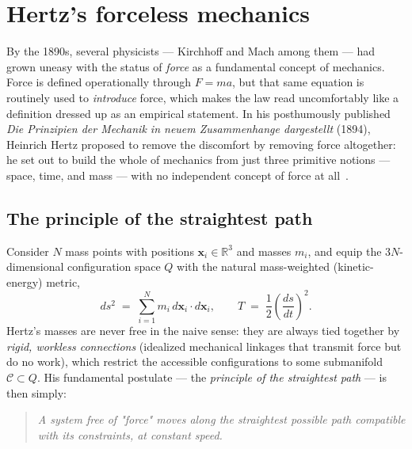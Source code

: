 \section{Hertz's forceless mechanics }
\label{lnf:hertz}

By the 1890s, several physicists --- Kirchhoff and Mach among them
--- had grown uneasy with the status of \emph{force} as a
fundamental concept of mechanics. Force is defined operationally
through $F=ma$, but that same equation is routinely used to
\emph{introduce} force, which makes the law read uncomfortably like
a definition dressed up as an empirical statement. In his
posthumously published \emph{Die Prinzipien der Mechanik in neuem
Zusammenhange dargestellt} (1894), Heinrich Hertz proposed to remove
the discomfort by removing force altogether: he set out to build the
whole of mechanics from just three primitive notions --- space,
time, and mass --- with no independent concept of force at
all~\cite{hertz}.

\subsection{The principle of the straightest path}

Consider $N$ mass points with positions $\mathbf x_i\in\mathbb R^3$
and masses $m_i$, and equip the $3N$-dimensional configuration space
$Q$ with the natural mass-weighted (kinetic-energy) metric,
\begin{equation}
  ds^2 \;=\; \sum_{i=1}^N m_i\, d\mathbf x_i\cdot d\mathbf x_i,
  \qquad
  T \;=\; \frac12\left(\frac{ds}{dt}\right)^{\!2}.
  \label{hertz-metric}
\end{equation}
Hertz's masses are never free in the naive sense: they are always
tied together by \emph{rigid, workless connections} (idealized
mechanical linkages that transmit force but do no work), which
restrict the accessible configurations to some submanifold
$\mathcal C\subset Q$. His fundamental postulate --- the
\emph{principle of the straightest path}
--- is then simply:

\begin{quote}
\emph{A system free of "force" moves along the straightest possible
path compatible with its constraints, at constant speed.}
\end{quote}

